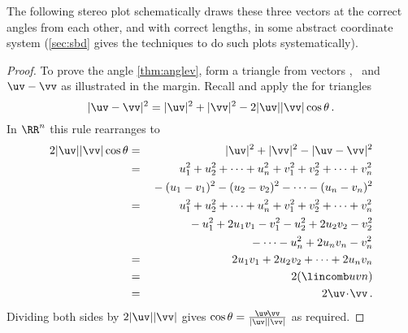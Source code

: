 \begin{example}
\begin{solution}
\begin{itemize}
\end{itemize}
The following stereo plot schematically draws these three vectors at the correct angles from each other, and with correct lengths, in some abstract coordinate system (\autoref{sec:sbd} gives the techniques to do such plots systematically).
\begin{center}
 {
}
\end{center}
\end{solution}
\end{example}



\begin{proof} 
To prove the angle \autoref{thm:anglev}, form a triangle from vectors \uv, \vv\ and \(\uv-\vv\) as illustrated in the margin.
%
Recall and apply the  for triangles
\begin{equation*}
|\uv-\vv|^2=|\uv|^2+|\vv|^2-2|\uv||\vv|\cos\theta\,.
\end{equation*}
In \(\RR^n\) this rule rearranges to
\begin{eqnarray*}
2|\uv||\vv|\cos\theta
&=&|\uv|^2+|\vv|^2-|\uv-\vv|^2
\\&=&u_1^2+u_2^2+\cdots+u_n^2
+v_1^2+v_2^2+\cdots+v_n^2
\\&&{}
-(u_1-v_1)^2-(u_2-v_2)^2-\cdots-(u_n-v_n)^2
\\&=&u_1^2+u_2^2+\cdots+u_n^2
+v_1^2+v_2^2+\cdots+v_n^2
\\&&{}
-u_1^2+2u_1v_1-v_1^2-u_2^2+2u_2v_2-v_2^2
\\&&{}
-\cdots-u_n^2+2u_nv_n-v_n^2
\\&=&2u_1v_1+2u_2v_2+\cdots+2u_nv_n
\\&=&2(\lincomb uvn)
\\&=&2\uv\cdot\vv\,.
\end{eqnarray*}
Dividing both sides by \(2|\uv||\vv|\) gives \(\cos\theta=\frac{\uv\cdot\vv}{|\uv||\vv|}\) as required.
\end{proof}





